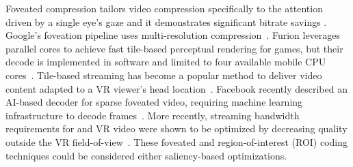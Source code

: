 Foveated compression tailors video compression specifically to the attention driven by a single eye's gaze and it demonstrates significant bitrate savings \cite{geisler1998real, albert}.
Google's foveation pipeline uses multi-resolution compression~\cite{google-foveation}.
Furion leverages parallel cores to achieve fast tile-based perceptual rendering for games, but their decode is implemented in software and limited to four available mobile CPU cores~\cite{furion2019}.
Tile-based streaming has become a popular method to deliver video content adapted to a VR viewer's head location~\cite{liu2018mobisys}.
Facebook recently described an AI-based decoder for sparse foveated video, requiring machine learning infrastructure to decode frames~\cite{kaplanyan2019deepfovea}.
More recently, streaming bandwidth requirements for \threesixty and VR video were shown to be optimized by decreasing quality outside the VR field-of-view~\cite{Fan:2017:FPV:3083165.3083180,fov-cloud-ryoo,saliency-map,visualcloud2017haynes}.
These foveated and region-of-interest (ROI) coding techniques could be considered either saliency-based optimizations.
